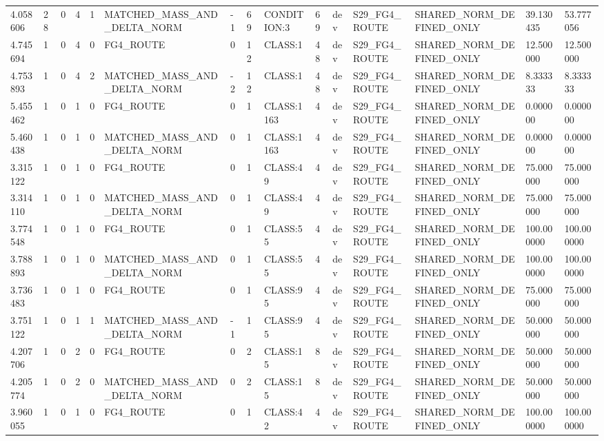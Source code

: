 \begin{tabular}{lllllllllllllll}
4.058606 & 28 & 0 & 4 & 1 & MATCHED\_MASS\_AND\_DELTA\_NORM & -1 & 69 & CONDITION:3 & 69 & dev & S29\_FG4\_ROUTE & SHARED\_NORM\_DEFINED\_ONLY & 39.130435 & 53.777056 \\
4.745694 & 1 & 0 & 4 & 0 & FG4\_ROUTE & 0 & 12 & CLASS:1 & 48 & dev & S29\_FG4\_ROUTE & SHARED\_NORM\_DEFINED\_ONLY & 12.500000 & 12.500000 \\
4.753893 & 1 & 0 & 4 & 2 & MATCHED\_MASS\_AND\_DELTA\_NORM & -2 & 12 & CLASS:1 & 48 & dev & S29\_FG4\_ROUTE & SHARED\_NORM\_DEFINED\_ONLY & 8.333333 & 8.333333 \\
5.455462 & 1 & 0 & 1 & 0 & FG4\_ROUTE & 0 & 1 & CLASS:1163 & 4 & dev & S29\_FG4\_ROUTE & SHARED\_NORM\_DEFINED\_ONLY & 0.000000 & 0.000000 \\
5.460438 & 1 & 0 & 1 & 0 & MATCHED\_MASS\_AND\_DELTA\_NORM & 0 & 1 & CLASS:1163 & 4 & dev & S29\_FG4\_ROUTE & SHARED\_NORM\_DEFINED\_ONLY & 0.000000 & 0.000000 \\
3.315122 & 1 & 0 & 1 & 0 & FG4\_ROUTE & 0 & 1 & CLASS:49 & 4 & dev & S29\_FG4\_ROUTE & SHARED\_NORM\_DEFINED\_ONLY & 75.000000 & 75.000000 \\
3.314110 & 1 & 0 & 1 & 0 & MATCHED\_MASS\_AND\_DELTA\_NORM & 0 & 1 & CLASS:49 & 4 & dev & S29\_FG4\_ROUTE & SHARED\_NORM\_DEFINED\_ONLY & 75.000000 & 75.000000 \\
3.774548 & 1 & 0 & 1 & 0 & FG4\_ROUTE & 0 & 1 & CLASS:55 & 4 & dev & S29\_FG4\_ROUTE & SHARED\_NORM\_DEFINED\_ONLY & 100.000000 & 100.000000 \\
3.788893 & 1 & 0 & 1 & 0 & MATCHED\_MASS\_AND\_DELTA\_NORM & 0 & 1 & CLASS:55 & 4 & dev & S29\_FG4\_ROUTE & SHARED\_NORM\_DEFINED\_ONLY & 100.000000 & 100.000000 \\
3.736483 & 1 & 0 & 1 & 0 & FG4\_ROUTE & 0 & 1 & CLASS:95 & 4 & dev & S29\_FG4\_ROUTE & SHARED\_NORM\_DEFINED\_ONLY & 75.000000 & 75.000000 \\
3.751122 & 1 & 0 & 1 & 1 & MATCHED\_MASS\_AND\_DELTA\_NORM & -1 & 1 & CLASS:95 & 4 & dev & S29\_FG4\_ROUTE & SHARED\_NORM\_DEFINED\_ONLY & 50.000000 & 50.000000 \\
4.207706 & 1 & 0 & 2 & 0 & FG4\_ROUTE & 0 & 2 & CLASS:15 & 8 & dev & S29\_FG4\_ROUTE & SHARED\_NORM\_DEFINED\_ONLY & 50.000000 & 50.000000 \\
4.205774 & 1 & 0 & 2 & 0 & MATCHED\_MASS\_AND\_DELTA\_NORM & 0 & 2 & CLASS:15 & 8 & dev & S29\_FG4\_ROUTE & SHARED\_NORM\_DEFINED\_ONLY & 50.000000 & 50.000000 \\
3.960055 & 1 & 0 & 1 & 0 & FG4\_ROUTE & 0 & 1 & CLASS:42 & 4 & dev & S29\_FG4\_ROUTE & SHARED\_NORM\_DEFINED\_ONLY & 100.000000 & 100.000000 \\

\end{tabular}

